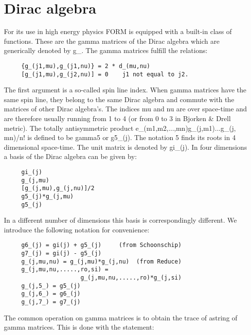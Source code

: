 
\chapter{Dirac algebra}
\label{gammaalgebra}

For its use in high energy physics FORM is 
equipped with a built-in class of functions. These are the 
gamma matrices of the Dirac 
algebra which are generically denoted by g\_. The gamma matrices 
fulfill the relations:
\begin{verbatim}
     {g_(j1,mu),g_(j1,nu)} = 2 * d_(mu,nu)
     [g_(j1,mu),g_(j2,nu)] = 0    j1 not equal to j2.
\end{verbatim}
The first argument is a so-called spin line index. When 
gamma matrices have the same spin line, they belong to the same Dirac 
algebra and commute with the matrices of other Dirac algebra's. The indices 
mu and nu are over space-time and are therefore usually running from 1 to 4 
(or from 0 to 3 in Bjorken \& Drell metric). 
The totally antisymmetric product e\_(m1,m2,...,mn)\*g\_(j,m1)\*...\*g\_(j,
mn)/n! is defined to be gamma5 or g5\_(j). The notation 5 finds 
its roots in 4 dimensional space-time. The unit matrix is denoted by 
gi\_(j). In four dimensions a basis of the Dirac algebra can be given by: 
\begin{verbatim}
     gi_(j)
     g_(j,mu)
     [g_(j,mu),g_(j,nu)]/2
     g5_(j)*g_(j,mu)
     g5_(j)
\end{verbatim}
In a different number of dimensions this basis is correspondingly 
different. We introduce the following notation for convenience: 
\begin{verbatim}
     g6_(j) = gi(j) + g5_(j)     (from Schoonschip)
     g7_(j) = gi(j) - g5_(j)
     g_(j,mu,nu) = g_(j,mu)*g_(j,nu)  (from Reduce)
     g_(j,mu,nu,.....,ro,si) =
                      g_(j,mu,nu,.....,ro)*g_(j,si)
     g_(j,5_) = g5_(j)
     g_(j,6_) = g6_(j)
     g_(j,7_) = g7_(j)
\end{verbatim}
The common operation on gamma matrices is to obtain the trace 
of astring of gamma matrices. This is done with the statement:


